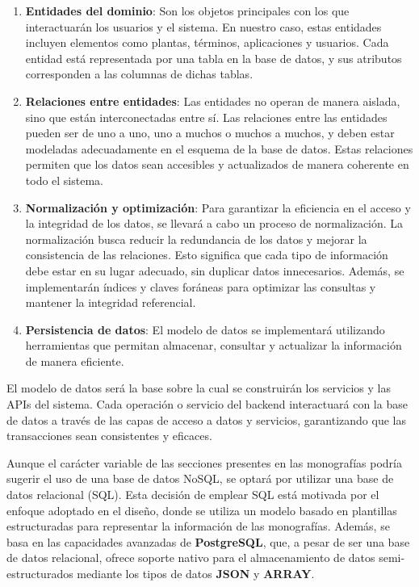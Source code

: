 \begin{enumerate} 
    \item \textbf{Entidades del dominio}: Son los objetos principales con los que interactuarán los usuarios y el sistema. 
    En nuestro caso, estas entidades incluyen elementos como plantas, términos, aplicaciones y usuarios. Cada entidad está representada 
    por una tabla en la base de datos, y sus atributos corresponden a las columnas de dichas tablas.
    \item \textbf{Relaciones entre entidades}: Las entidades no operan de manera aislada, sino que están interconectadas entre sí. Las relaciones 
    entre las entidades pueden ser de uno a uno, uno a muchos o muchos a muchos, y deben estar modeladas adecuadamente en el esquema de la 
    base de datos. Estas relaciones permiten que los datos sean accesibles y actualizados de manera coherente en todo el sistema.
    \item \textbf{Normalización y optimización}: Para garantizar la eficiencia en el acceso y la integridad de los datos, se llevará a cabo un 
    proceso de normalización. La normalización busca reducir la redundancia de los datos y mejorar la consistencia de las relaciones. Esto significa 
    que cada tipo de información debe estar en su lugar adecuado, sin duplicar datos innecesarios.
    Además, se implementarán índices y claves foráneas para optimizar las consultas y mantener la integridad referencial.
    \item \textbf{Persistencia de datos}: El modelo de datos se implementará utilizando herramientas que permitan almacenar, consultar y actualizar la información de manera eficiente.
\end{enumerate}

El modelo de datos será la base sobre la cual se construirán los servicios y las APIs del sistema. Cada operación o servicio del backend interactuará con la base de datos a través 
de las capas de acceso a datos y servicios, garantizando que las transacciones sean consistentes y eficaces.

Aunque el carácter variable de las secciones presentes en las monografías podría sugerir el uso de una base de datos NoSQL, se optará por utilizar una base de datos relacional (SQL).
Esta decisión de emplear SQL está motivada por el enfoque adoptado en el diseño, donde se utiliza un modelo basado en plantillas estructuradas para representar la información de las monografías.
Además, se basa en las capacidades avanzadas de \textbf{PostgreSQL}, que, a pesar de ser una base de datos relacional, ofrece soporte nativo para el almacenamiento de datos semi-estructurados 
mediante los tipos de datos \textbf{JSON} y \textbf{ARRAY}. 

